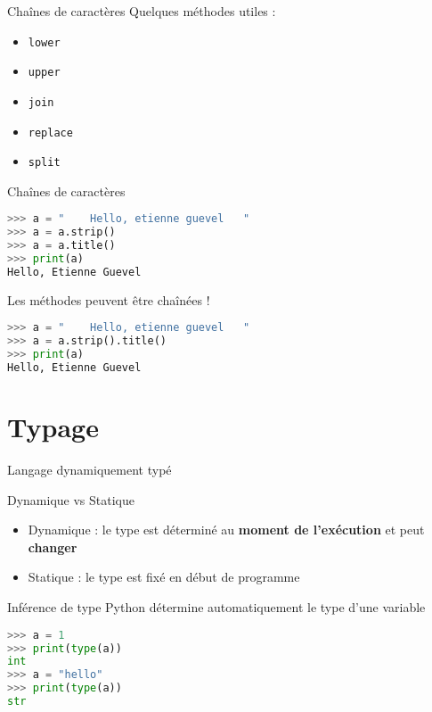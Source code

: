 \begin{frame}{Chaînes de caractères}
  Quelques méthodes utiles :
  \begin{itemize}
    \item \texttt{lower}
    \item \texttt{upper}
    \item \texttt{join}
    \item \texttt{replace}
    \item \texttt{split}
  \end{itemize}
  
\end{frame}


\begin{frame}[fragile]{Chaînes de caractères}

\begin{lstlisting}[language=Python, numbers=none]
>>> a = "    Hello, etienne guevel   "
>>> a = a.strip()
>>> a = a.title()
>>> print(a)
Hello, Etienne Guevel
\end{lstlisting}
    
Les méthodes peuvent être chaînées !
\begin{lstlisting}[language=Python, numbers=none]
>>> a = "    Hello, etienne guevel   "
>>> a = a.strip().title()
>>> print(a)
Hello, Etienne Guevel
\end{lstlisting}
\end{frame}

\section{Typage}


\begin{frame}[fragile]{Langage dynamiquement typé}

  \begin{block}{Dynamique vs Statique}
  \medskip
    \begin{itemize}
      \item Dynamique : le type est déterminé au \textbf{moment de l'exécution} et peut \textbf{changer}
      \item Statique : le type est fixé en début de programme
    \end{itemize}
  \end{block}

  \begin{block}{Inférence de type}
  \medskip
  Python détermine automatiquement le type d'une variable
  \end{block}

\begin{lstlisting}[language=Python, morekeywords={as, TypeError}, numbers=none]
>>> a = 1
>>> print(type(a))
int
>>> a = "hello"
>>> print(type(a))
str
\end{lstlisting}
\end{frame}




